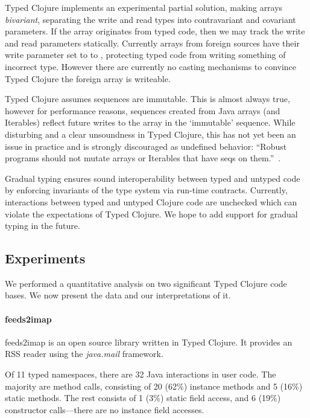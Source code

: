 Typed Clojure implements an experimental partial solution, making arrays \emph{bivariant},
separating the write and read types into contravariant and covariant parameters.
If the array originates from typed code, then we may track the write and read
parameters statically. Currently arrays from foreign sources
have their write parameter set to to \Bot{}, protecting typed code from writing
something of incorrect type. However there are currently no casting mechanisms to 
convince Typed Clojure the foreign array is writeable.

Typed Clojure assumes sequences are immutable. This is almost always true, however
for performance reasons,
sequences created from Java arrays (and Iterables) reflect future writes to the array 
in the `immutable' sequence. While disturbing and a clear unsoundness in Typed Clojure,
this has not yet been an issue in practice and is strongly discouraged as undefined behavior:
``Robust programs should not mutate arrays or Iterables that have seqs on them.''~\cite{CljSeqDoc}.

Gradual typing ensures sound interoperability between typed and untyped code by enforcing
invariants of the type system via run-time contracts.
Currently, interactions between typed and untyped Clojure code are unchecked
which can violate the expectations of Typed Clojure. We hope to add support
for gradual typing in the future.

\subsection{Experiments}
\label{sec:casestudy}

We performed a quantitative analysis on two significant Typed Clojure code bases.
We now present the data and our interpretations of it.

\paragraph{feeds2imap}
feeds2imap is an open source library written in Typed Clojure. It provides an
RSS reader using the \emph{java.mail} framework.

Of 11 typed namespaces, there are 32 Java interactions in user code.
The majority are method calls, consisting of 
20 (62\%) instance methods and 5 (16\%) static methods.
The rest consists of 1 (3\%) static field access, and
6 (19\%) constructor calls---there are no instance field
accesses.

